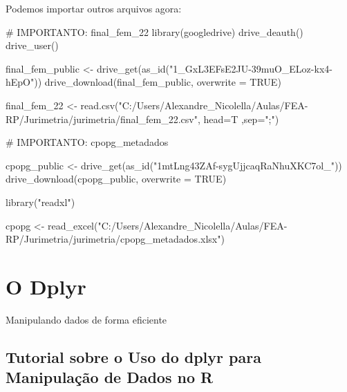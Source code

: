 \documentclass[
  letterpaper,
  DIV=11,
  numbers=noendperiod]{scrreprt}
\newenvironment{Shaded}{\begin{snugshade}}{\end{snugshade}}
\newcommand{\AttributeTok}[1]{\textcolor[rgb]{0.40,0.45,0.13}{#1}}
\newcommand{\CommentTok}[1]{\textcolor[rgb]{0.37,0.37,0.37}{#1}}
\newcommand{\ConstantTok}[1]{\textcolor[rgb]{0.56,0.35,0.01}{#1}}
\newcommand{\FunctionTok}[1]{\textcolor[rgb]{0.28,0.35,0.67}{#1}}
\newcommand{\NormalTok}[1]{\textcolor[rgb]{0.00,0.23,0.31}{#1}}
\newcommand{\OtherTok}[1]{\textcolor[rgb]{0.00,0.23,0.31}{#1}}
\newcommand{\StringTok}[1]{\textcolor[rgb]{0.13,0.47,0.30}{#1}}
\begin{document}
Podemos importar outros arquivos agora:

\begin{Shaded}
\begin{Highlighting}[]
\CommentTok{\# IMPORTANTO: final\_fem\_22}
\FunctionTok{library}\NormalTok{(googledrive)}
\FunctionTok{drive\_deauth}\NormalTok{()    }
\FunctionTok{drive\_user}\NormalTok{()      }

\NormalTok{final\_fem\_public }\OtherTok{\textless{}{-}}  \FunctionTok{drive\_get}\NormalTok{(}\FunctionTok{as\_id}\NormalTok{(}\StringTok{"1\_GxL3EFsE2JU{-}39muO\_ELoz{-}kx4{-}hEpO"}\NormalTok{))   }
\FunctionTok{drive\_download}\NormalTok{(final\_fem\_public, }\AttributeTok{overwrite =} \ConstantTok{TRUE}\NormalTok{)   }

\NormalTok{final\_fem\_22 }\OtherTok{\textless{}{-}} \FunctionTok{read.csv}\NormalTok{(}\StringTok{"C:/Users/Alexandre\_Nicolella/Aulas/FEA{-}RP/Jurimetria/jurimetria/final\_fem\_22.csv"}\NormalTok{, }\AttributeTok{head=}\NormalTok{T ,}\AttributeTok{sep=}\StringTok{";"}\NormalTok{)}


\CommentTok{\# IMPORTANTO: cpopg\_metadados}

\NormalTok{cpopg\_public }\OtherTok{\textless{}{-}}  \FunctionTok{drive\_get}\NormalTok{(}\FunctionTok{as\_id}\NormalTok{(}\StringTok{"1mtLng43ZAf{-}sygUjjcaqRaNhuXKC7ol\_"}\NormalTok{))   }
\FunctionTok{drive\_download}\NormalTok{(cpopg\_public, }\AttributeTok{overwrite =} \ConstantTok{TRUE}\NormalTok{)   }

\FunctionTok{library}\NormalTok{(}\StringTok{"readxl"}\NormalTok{)}

\NormalTok{cpopg }\OtherTok{\textless{}{-}} \FunctionTok{read\_excel}\NormalTok{(}\StringTok{"C:/Users/Alexandre\_Nicolella/Aulas/FEA{-}RP/Jurimetria/jurimetria/cpopg\_metadados.xlsx"}\NormalTok{)}
\end{Highlighting}
\end{Shaded}


\chapter{O Dplyr}\label{o-dplyr}

Manipulando dados de forma eficiente

\hfill\break

\section{Tutorial sobre o Uso do dplyr para Manipulação de Dados no
R}\label{tutorial-sobre-o-uso-do-dplyr-para-manipulauxe7uxe3o-de-dados-no-r}
\end{document}
